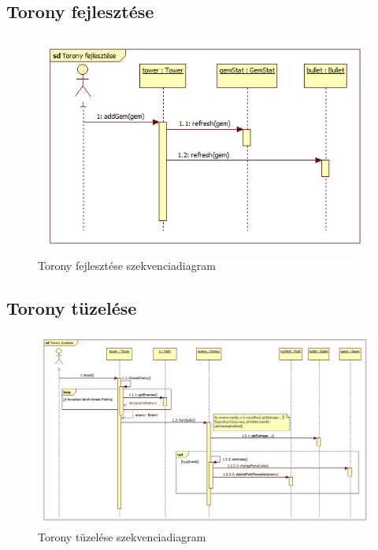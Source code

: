 \subsection{Torony fejlesztése}
\begin{figure}[H]
\begin{center}
\includegraphics[width=17cm]{chapters/chapter03/images/Torony_fejlesztese.jpg}
\caption{Torony fejlesztése szekvenciadiagram}
\label{fig:Torony_fejlesztése}
\end{center}
\end{figure}

\subsection{Torony tüzelése}
\begin{figure}[H]
\begin{center}
\includegraphics[width=17cm]{chapters/chapter03/images/Torony_tuzelese.jpg}
\caption{Torony tüzelése szekvenciadiagram}
\label{fig:Torony_tüzelése}
\end{center}
\end{figure}


